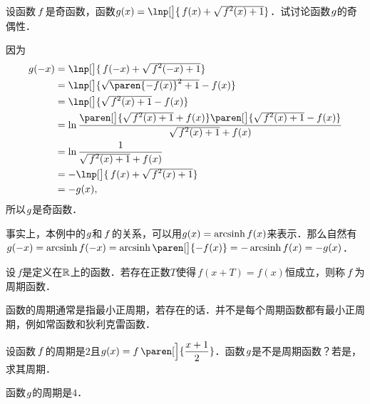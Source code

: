 \begin{example*}
  设函数\(\,f\mkern2mu\)是奇函数，函数\(g(x) = \lnp[\big]{\,f(x) + \sqrt{\,\smash{f^2(x)+1}\rule[-.3ex]{0ex}{1.8ex}}}\)．试讨论函数\(\mkern1mu g\)的奇偶性．

  \begin{remark}
    因为
    \[
      \begin{split}
        g(-x)
        &= \lnp[\big]{\,f(-x) + \sqrt{\,\smash{f^2(-x)+1}\rule[-.3ex]{0ex}{1.8ex}}} \\
        &= \lnp[\big]{\sqrt{\smash{\paren{-f(x)}^2+1}\rule[-.3ex]{0ex}{1.8ex}} - f(x)} \\
        &= \lnp[\big]{\sqrt{\,\smash{f^2(x)+1}\rule[-.3ex]{0ex}{1.8ex}} - f(x)} \\
        &= \ln{\frac{
          \paren[\big]{\sqrt{\,\smash{f^2(x)+1}\rule[-.3ex]{0ex}{1.8ex}} + f(x)}
          \paren[\big]{\sqrt{\,\smash{f^2(x)+1}\rule[-.3ex]{0ex}{1.8ex}} - f(x)}
          }{
          \sqrt{\,\smash{f^2(x)+1}\rule[-.3ex]{0ex}{1.8ex}} + f(x)}
          } \\
        &= \ln \frac1{\sqrt{\,\smash{f^2(x)+1}\rule[-.3ex]{0ex}{1.8ex}} + f(x)} \\
        &= -\lnp[\big]{\,f(x) + \sqrt{\,\smash{f^2(x)+1}\rule[-.3ex]{0ex}{1.8ex}}} \\
        &= -g(x),
      \end{split}
    \]
    所以\(\mkern1mu g\)是奇函数．

    事实上，本例中的\(\mkern1mu g\)和\(\,f\mkern2mu\)的关系，可以用\(g(x) = \operatorname{arcsinh} f(x)\)来表示．那么自然有\(g(-x) = \arcsinh f(-x) = \arcsinh\paren[\big]{-f(x)} = - \arcsinh f(x) = -g(x)\)．
  \end{remark}
\end{example*}

\begin{definition*}
  设\(\,f\)是定义在\(\mathbb{R}\)上的函数．若存在正数\(T\)使得\(\,f(x+T) = f(x)\)恒成立，则称\(\,f\mkern2mu\)为周期函数．

  \begin{remark}
    函数的周期通常是指最小正周期，若存在的话．并不是每个周期函数都有最小正周期，例如常函数和狄利克雷函数．
  \end{remark}
\end{definition*}

\begin{example*}
  设函数\(\,f\mkern2mu\)的周期是\(2\)且\(g(x) = f\,\paren[\Big]{\dfrac{x+1}{2}}\)．函数\(\mkern1mu g\)是不是周期函数？若是，求其周期．

  \begin{remark}
    函数\(\mkern1mu g\)的周期是\(4\)．
  \end{remark}
\end{example*}

